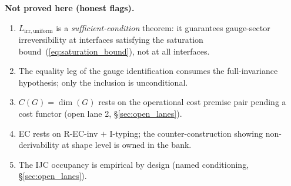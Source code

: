 \documentclass[11pt]{article}
\theoremstyle{definition}
\begin{document}
\begin{tcolorbox}[apfbox, title={What Is Assumed, What Is Proved, What Is Deferred}]
\smallskip\noindent\textbf{Not proved here (honest flags).}
\begin{enumerate}[nosep,label=\arabic*.,leftmargin=2em]
  \item $L_{\mathrm{irr,uniform}}$ is a \emph{sufficient-condition} theorem: it guarantees gauge-sector irreversibility at interfaces satisfying the saturation bound~(\ref{eq:saturation_bound}), not at all interfaces.
  \item The equality leg of the gauge identification consumes the full-invariance hypothesis; only the inclusion is unconditional.
  \item $C(G) = \dim(G)$ rests on the operational cost premise pair pending a cost functor (open lane 2, \S\ref{sec:open_lanes}).
  \item EC rests on R-EC-inv $+$ I-typing; the counter-construction showing non-derivability at shape level is owned in the bank.
  \item The IJC occupancy is empirical by design (named conditioning, \S\ref{sec:open_lanes}).
\end{enumerate}
\end{tcolorbox}
\end{document}
